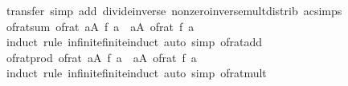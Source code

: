 \begin{isabellebody}
\ transfer\ {\isacharparenleft}{\kern0pt}simp\ add{\isacharcolon}{\kern0pt}\ divide{\isacharunderscore}{\kern0pt}inverse\ nonzero{\isacharunderscore}{\kern0pt}inverse{\isacharunderscore}{\kern0pt}mult{\isacharunderscore}{\kern0pt}distrib\ ac{\isacharunderscore}{\kern0pt}simps{\isacharparenright}{\kern0pt}%
\endisatagproof
{\isafoldproof}%
%
\isadelimproof
\isanewline
%
\endisadelimproof
\isanewline
{}\isamarkupfalse%
\ of{\isacharunderscore}{\kern0pt}rat{\isacharunderscore}{\kern0pt}sum{\isacharcolon}{\kern0pt}\ {\isachardoublequoteopen}of{\isacharunderscore}{\kern0pt}rat\ {\isacharparenleft}{\kern0pt}{\isasymSum}a{\isasymin}A{\isachardot}{\kern0pt}\ f\ a{\isacharparenright}{\kern0pt}\ {\isacharequal}{\kern0pt}\ {\isacharparenleft}{\kern0pt}{\isasymSum}a{\isasymin}A{\isachardot}{\kern0pt}\ of{\isacharunderscore}{\kern0pt}rat\ {\isacharparenleft}{\kern0pt}f\ a{\isacharparenright}{\kern0pt}{\isacharparenright}{\kern0pt}{\isachardoublequoteclose}\isanewline
%
\isadelimproof
\ \ %
\endisadelimproof
%
\isatagproof
{}\isamarkupfalse%
\ {\isacharparenleft}{\kern0pt}induct\ rule{\isacharcolon}{\kern0pt}\ infinite{\isacharunderscore}{\kern0pt}finite{\isacharunderscore}{\kern0pt}induct{\isacharparenright}{\kern0pt}\ {\isacharparenleft}{\kern0pt}auto\ simp{\isacharcolon}{\kern0pt}\ of{\isacharunderscore}{\kern0pt}rat{\isacharunderscore}{\kern0pt}add{\isacharparenright}{\kern0pt}%
\endisatagproof
{\isafoldproof}%
%
\isadelimproof
\isanewline
%
\endisadelimproof
\isanewline
{}\isamarkupfalse%
\ of{\isacharunderscore}{\kern0pt}rat{\isacharunderscore}{\kern0pt}prod{\isacharcolon}{\kern0pt}\ {\isachardoublequoteopen}of{\isacharunderscore}{\kern0pt}rat\ {\isacharparenleft}{\kern0pt}{\isasymProd}a{\isasymin}A{\isachardot}{\kern0pt}\ f\ a{\isacharparenright}{\kern0pt}\ {\isacharequal}{\kern0pt}\ {\isacharparenleft}{\kern0pt}{\isasymProd}a{\isasymin}A{\isachardot}{\kern0pt}\ of{\isacharunderscore}{\kern0pt}rat\ {\isacharparenleft}{\kern0pt}f\ a{\isacharparenright}{\kern0pt}{\isacharparenright}{\kern0pt}{\isachardoublequoteclose}\isanewline
%
\isadelimproof
\ \ %
\endisadelimproof
%
\isatagproof
{}\isamarkupfalse%
\ {\isacharparenleft}{\kern0pt}induct\ rule{\isacharcolon}{\kern0pt}\ infinite{\isacharunderscore}{\kern0pt}finite{\isacharunderscore}{\kern0pt}induct{\isacharparenright}{\kern0pt}\ {\isacharparenleft}{\kern0pt}auto\ simp{\isacharcolon}{\kern0pt}\ of{\isacharunderscore}{\kern0pt}rat{\isacharunderscore}{\kern0pt}mult{\isacharparenright}{\kern0pt}%
\endisatagproof
{\isafoldproof}%
%
\isadelimproof
\isanewline

\end{isabellebody}
